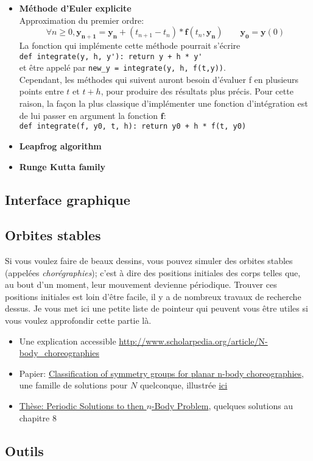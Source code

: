 \documentclass{article}
\newcommand{\myvec}[1]{\ensuremath{\mathbf{#1}}}
\begin{document}
\vspace{1em}

\begin{itemize}
    \item \textbf{Méthode d'Euler explicite} \\
    Approximation du premier ordre:
    \begin{equation*}
        \forall n \ge 0, \myvec{y_{n+1}} = \myvec{y_n} + (t_{n+1} - t_n) * \myvec{f}(t_n, \myvec{y_n}) \quad\quad \myvec{y_0} = \myvec{y}(0)
    \end{equation*}
    La fonction qui implémente cette méthode pourrait s'écrire\\
    \verb!def integrate(y, h, y'): return y + h * y'!\\
    et être appelé par \verb!new_y = integrate(y, h, f(t,y))!. \\
    Cependant, les méthodes qui suivent auront besoin d'évaluer f en plusieurs points entre $t$ et $t+h$, pour produire des résultats plus précis. Pour cette raison, la façon la plus classique d'implémenter une fonction d'intégration est de lui passer en argument la fonction $\myvec{f}$:\\
    \verb!def integrate(f, y0, t, h): return y0 + h * f(t, y0)!

    \item \textbf{Leapfrog algorithm}

    \item \textbf{Runge Kutta family}
\end{itemize}

\subsection{Interface graphique}
\label{interface}

\subsection{Orbites stables}

Si vous voulez faire de beaux dessins, vous pouvez simuler des orbites stables (appelées \emph{chorégraphies}); c'est à dire des positions initiales des corps telles que, au bout d'un moment, leur mouvement devienne périodique. Trouver ces positions initiales est loin d'être facile, il y a de nombreux travaux de recherche dessus. Je vous met ici une petite liste de pointeur qui peuvent vous être utiles si vous voulez approfondir cette partie là.

\begin{itemize}
    \item Une explication accessible \url{http://www.scholarpedia.org/article/N-body_choreographies}
    \item Papier: \href{http://eprints.maths.manchester.ac.uk/2063/1/choreographies.pdf}{Classification of symmetry groups for planar n-body choreographies}, une famille de solutions pour $N$ quelconque, illustrée \href{http://rectangleworld.com/demos/nBody/}{ici}
    \item \href{http://www.combinatorialmath.ca/Students/DyckThesis.pdf}{Thèse: Periodic Solutions to then $n$-Body Problem}, quelques solutions au chapitre 8
\end{itemize}

\subsection{Outils}
\label{outils}
\end{document}
